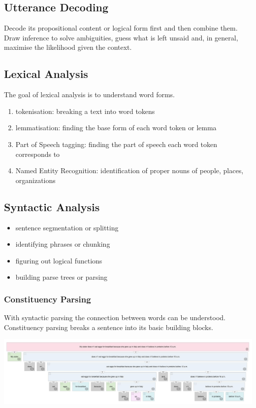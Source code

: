 \documentclass[11pt]{article}
\begin{document}
\subsection{Utterance Decoding}
Decode its propositional content or logical form first and then combine them. Draw inference to solve ambiguities, guess what is left unsaid and, in general, maximise the likelihood given the context.

\subsection{Lexical Analysis}
The goal of lexical analysis is to understand word forms.
\begin{enumerate}
	\item tokenisation: breaking a text into word tokens
	\item lemmatisation: finding the base form of each word token or lemma
	\item Part of Speech tagging: finding the part of speech each word token corresponds to
	\item Named Entity Recognition:  identification of proper nouns of people, places, organizations
\end{enumerate}

\subsection{Syntactic Analysis}
\begin{itemize}
	\item sentence segmentation or splitting
	\item identifying phrases or chunking
	\item figuring out logical functions
	\item building parse trees or parsing
\end{itemize}

\subsubsection{Constituency Parsing}
With syntactic parsing the connection between words can be understood. Constituency parsing breaks a sentence into its basic building blocks.

\begin{center}
	\includegraphics[width=\linewidth]{img/parse_tree_syntactic_parsing}
\end{center}
\end{document}
